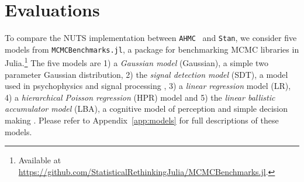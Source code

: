 \documentclass[tablecaption=bottom,wcp]{jmlr} %
\def\ahmc{\texttt{AHMC}}
\def\stan{\texttt{Stan}}
\begin{document}





\section{Evaluations}
To compare the NUTS implementation between \ahmc~ and \texttt{Stan}, we consider five models from \texttt{MCMCBenchmarks.jl}, a package for benchmarking MCMC libraries in Julia.\footnote{Available at \url{https://github.com/StatisticalRethinkingJulia/MCMCBenchmarks.jl}.} The five models are 1) a \textit{Gaussian model} (Gaussian), a simple two parameter Gaussian distribution, 2) the \textit{signal detection model} (SDT), a model used in psychophysics and signal processing \citep{green1966signal}, 3) a \textit{linear regression} model (LR), 4) a \textit{hierarchical Poisson regression} (HPR) model and 5) the \textit{linear ballistic accumulator model} (LBA), a cognitive model of perception and simple decision making \citep{brown2008simplest}. Please refer to Appendix~\ref{app:models} for full descriptions of these models.
\end{document}
